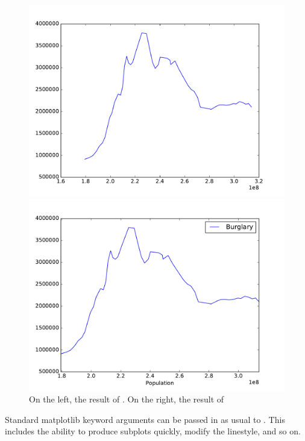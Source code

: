 \begin{figure}[H] %
    \centering
    \begin{minipage}[b]{0.48\textwidth}
    \includegraphics[width=\textwidth]{pltBurglary.pdf}
    \end{minipage}
    \quad
    \begin{minipage}[b]{0.48\textwidth}
    \includegraphics[width=\textwidth]{dfBurglary.pdf}
    \end{minipage}
    \caption{On the left, the result of . On the right, the result of }
    \label{fig:compare}
\end{figure}

Standard matplotlib keyword arguments can be passed in as usual to .
This includes the ability to produce subplots quickly, modify the linestyle, and so on.

